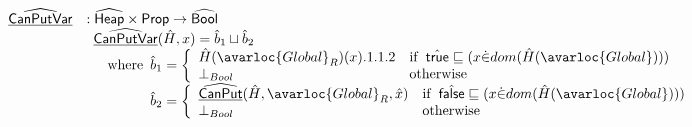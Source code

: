 \[\begin{array}{ll}
\ahf{CanPutVar} & : \aHeap \times \SF{Prop} \rightarrow \abs{Bool}\\
&
\begin{array}{ll}
\ahf{CanPutVar}(\hat{H},x)
  =  \hat{b}_1\sqcup\hat{b}_2\\
  \quad\wherec{
    \hat{b}_1 =
      \left\{
        \begin{array}{ll}
          \hat{H}(\avarloc{Global}_R)(x).1.1.2 & \ifc{\atrue\sqsubseteq(x \dot{\in} dom(\hat{H}(\avarloc{Global})))} \\
          \bot_{Bool} & \owc \\
        \end{array}
      \right.\\
    \hat{b}_2 = 
      \left\{
        \begin{array}{ll}
          \ahf{CanPut}(\hat{H},\avarloc{Global}_R,\hat{x}) & \ifc{\afalse\sqsubseteq(x \dot{\in} dom(\hat{H}(\avarloc{Global})))} \\
          \bot_{Bool} & \owc \\
        \end{array}
      \right.\\
  }
\end{array}\\
\\
\end{array}
\]



